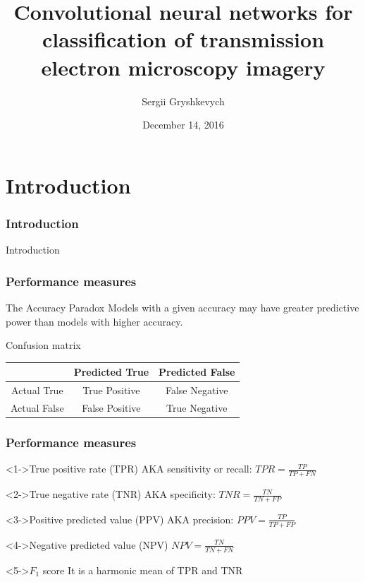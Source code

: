 \documentclass{beamer}
\title{Convolutional neural networks
for classification of transmission
electron microscopy imagery}
\subtitle{}
\author{Sergii Gryshkevych}
\institute{Uppsala University}
\date{December 14, 2016}
\begin{document}
\begin{frame}
\titlepage
\end{frame}

\section{Introduction}

\begin{frame}
\frametitle{Introduction}
Introduction
\end{frame}

%
%

\begin{frame}
\frametitle{Performance measures}

\begin{block}{The Accuracy Paradox}
Models with a given accuracy may have greater predictive power than models with higher accuracy.
\end{block}

\begin{block}{Confusion matrix}
\begin{table}
\begin{tabular}{|c|c|c|}
\hline 
 & Predicted True & Predicted False \\ 
\hline 
Actual True & True Positive & False Negative \\ 
\hline 
Actual False & False Positive & True Negative \\ 
\hline 
\end{tabular} 
\end{table}
\end{block}


\end{frame}

\begin{frame}
\frametitle{Performance measures}

\begin{block}<1->{True positive rate (TPR)}
AKA sensitivity or recall: $TPR = \frac{TP}{TP + FN}$
\end{block}

\begin{block}<2->{True negative rate (TNR)}
AKA specificity: $TNR = \frac{TN}{TN + FP}$
\end{block}

\begin{block}<3->{Positive predicted value (PPV)}
AKA precision: $PPV = \frac{TP}{TP + FP}$
\end{block}

\begin{block}<4->{Negative predicted value (NPV)}
$NPV = \frac{TN}{TN + FN}$
\end{block}

\begin{block}<5->{$F_1$ score}
It is a harmonic mean of TPR and TNR
\end{block}

\end{frame}
\end{document}
